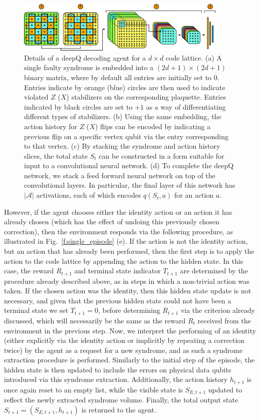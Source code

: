 \documentclass[twocolumn,preprintnumbers,amsmath,amssymb,notitlepage,nofootinbib,longbibliography,superscriptaddress,aps,pra,10pt]{revtex4-1}
\begin{document}
	\begin{figure}
		\centering
		\includegraphics[width=0.9\textwidth]{figures/agent.pdf}
		\caption{
			Details of a deepQ decoding agent for a $d\times d$ code lattice.
			(a) A single faulty syndrome is embedded into a $(2d +1)\times(2d+1)$ binary matrix, where by default all entries are initially set to $0$.
			Entries indicate by orange (blue) circles are then used to indicate violated $Z$ ($X$) stabilizers on the corresponding plaquette.
			Entries indicated by black circles are set to $+1$ as a way of differentiating different types of stabilizers.
			(b) Using the same embedding, the action history for $Z$ ($X$) flips can be encoded by indicating a previous flip on a specific vertex qubit via the entry corresponding to that vertex.
			(c) By stacking the syndrome and action history slices, the total state $S_t$ can be constructed in a form suitable for input to a convolutional neural network.
			(d) To complete the deepQ network, we stack a feed forward neural network on top of the convolutional layers.
			In particular, the final layer of this network has $|\mathcal{A}|$ activations, each of which encodes $q(S_t,a)$ for an action $a$.
		}
		\label{f:agent}
	\end{figure}

	However, if the agent chooses either the identity action or an action it has already chosen (which has the effect of undoing this previously chosen correction), then the environment responds via the following procedure, as illustrated in Fig.~\ref{f:single_episode} (e).
	If the action is not the identity action, but an action that has already been performed, then the first step is to apply the action to the code lattice by appending the action to the hidden state.
	In this case, the reward $R_{t+1}$ and terminal state indicator $T_{t+1}$ are determined by the procedure already described above, as in steps in which a non-trivial action was taken.
	If the chosen action was the identity, then this hidden state update is not necessary, and given that the previous hidden state could not have been a terminal state we set $T_{t+1} = 0$, before determining $R_{t+1}$ via the criterion already discussed, which will necessarily be the same as the reward $R_t$ received from the environment in the previous step. 
	Now, we interpret the performing of an identity (either explicitly via the identity action or implicitly by repeating a correction twice) by the agent as a request for a new syndrome, and as such a syndrome extraction procedure is performed.
	Similarly to the initial step of the episode, the hidden state is then updated to include the errors on physical data qubits introduced via this syndrome extraction.
	Additionally, the action history $h_{t+1}$ is once again reset to an empty list, while the visible state is $S_{E,t+1}$ updated to reflect the newly extracted syndrome volume.
	Finally, the total output state $S_{t+1} = (S_{E,t+1},h_{t+1})$ is returned to the agent.
\end{document}
